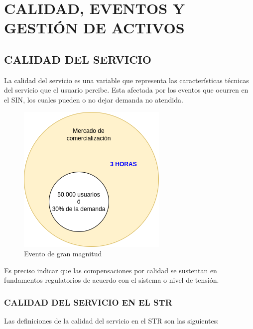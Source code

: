 \documentclass[a5paper]{book}%
\begin{document}
\part{CALIDAD, EVENTOS Y GESTIÓN DE ACTIVOS}

\chapter{CALIDAD DEL SERVICIO}

La calidad del servicio  es una variable que representa las características técnicas del servicio que el usuario percibe. Esta afectada por los eventos que ocurren en
el \ac{SIN}, los cuales pueden o no dejar demanda no atendida.

\begin{figure}[H]
  \centering
  \caption{Evento de gran magnitud}
  \label{fig:eventogranmagnitud}
  \includegraphics[width=0.6\linewidth]{evento_gran_magnitud}
\end{figure}

Es preciso indicar que las compensaciones por calidad se sustentan en fundamentos regulatorios
de acuerdo con el sistema o nivel de tensión.


\section{CALIDAD DEL SERVICIO EN EL STR}

Las definiciones de la calidad del servicio en el \ac{STR} son las siguientes:
\end{document}
